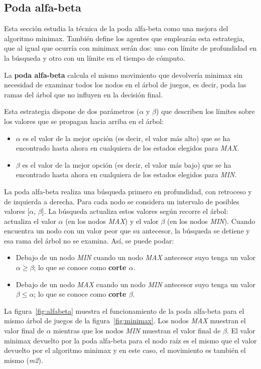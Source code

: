 \subsection{Poda alfa-beta}
\label{ssec:poda_alfa_beta}
Esta sección estudia la técnica de la poda alfa-beta como una mejora del algoritmo minimax.
También define los agentes que emplearán esta estrategia, que al igual que ocurría con minimax serán dos: uno con límite de profundidad en la búsqueda y otro con un límite en el tiempo de cómputo.

\bigskip
La \textbf{poda alfa-beta} calcula el mismo movimiento que devolvería minimax sin necesidad de examinar todos los nodos en el árbol de juegos, es decir, poda las ramas del árbol que no influyen en la decisión final.

Esta estrategia dispone de dos parámetros ($\alpha$ y $\beta$) que describen los límites sobre los valores que se propagan hacia arriba en el árbol:
\begin{itemize}
	\item $\alpha$ es el valor de la mejor opción (es decir, el valor más alto) que se ha encontrado hasta ahora en cualquiera de los estados elegidos para \textit{MAX}. 
	\item $\beta$ es el valor de la mejor opción (es decir, el valor más bajo) que se ha encontrado hasta ahora en cualquiera de los estados elegidos para \textit{MIN}.
\end{itemize}
La poda alfa-beta realiza una búsqueda primero en profundidad, con retroceso y de izquierda a derecha.
Para cada nodo se considera un intervalo de posibles valores [$\alpha$, $\beta$].
La búsqueda actualiza estos valores según recorre el árbol: actualiza el valor $\alpha$ (en los nodos \textit{MAX}) y el valor $\beta$ (en los nodos \textit{MIN}).
Cuando encuentra un nodo con un valor peor que su antecesor, la búsqueda se detiene y esa rama del árbol no se examina.
Así, se puede podar:
\begin{itemize}
\renewcommand{\labelitemi}{-}
	\item Debajo de un nodo \textit{MIN} cuando un nodo \textit{MAX} antecesor suyo tenga un valor $\alpha \geq \beta$; lo que se conoce como \textbf{corte $\alpha$}.
	\item Debajo de un nodo \textit{MAX} cuando un nodo \textit{MIN} antecesor suyo tenga un valor $\beta \leq \alpha$; lo que se conoce como \textbf{corte $\beta$}.
\end{itemize}

La figura~\ref{fig:alfabeta} muestra el funcionamiento de la poda alfa-beta para el mismo árbol de juegos de la figura~\ref{fig:minimax}.
Los nodos \textit{MAX} muestran el valor final de $\alpha$ mientras que los nodos \textit{MIN} muestran el valor final de $\beta$.
El valor minimax devuelto por la poda alfa-beta para el nodo raíz es el mismo que el valor devuelto por el algoritmo minimax y en este caso, el movimiento es también el mismo (\textit{m2}).

